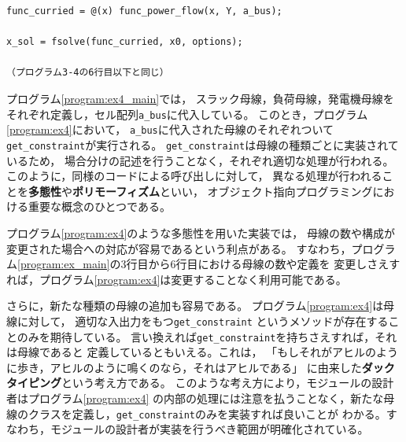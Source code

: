 \documentclass[tombow,dvipdfmx]{corona-a5-1.1}
\begin{document}
\begin{例}[多態性を用いた潮流計算の実装例]
\begin{PROGRAMA}[count,title={main\_ex4.m}]
\begin{verbatim}
func_curried = @(x) func_power_flow(x, Y, a_bus);

x_sol = fsolve(func_curried, x0, options);

（プログラム3-4の6行目以下と同じ）
\end{verbatim}
\end{PROGRAMA}
プログラム\nobreak\ref{program:ex4_main}では，
スラック母線，負荷母線，発電機母線を
それぞれ定義し，セル配列\verb|a_bus|に代入している。
このとき，プログラム\nobreak\ref{program:ex4}において，
\verb|a_bus|に代入された母線のそれぞれついて\verb|get_constraint|が実行される。
\verb|get_constraint|は母線の種類ごとに実装されているため，
場合分けの記述を行うことなく，それぞれ適切な処理が行われる。
このように，同様のコードによる呼び出しに対して，
異なる処理が行われることを\textbf{多態性}や\textbf{ポリモーフィズム}といい，
オブジェクト指向プログラミングにおける重要な概念のひとつである。

プログラム\nobreak\ref{program:ex4}のような多態性を用いた実装では，
母線の数や構成が変更された場合への対応が容易であるという利点がある。
すなわち，プログラム\nobreak\ref{program:ex_main}の3行目から6行目における母線の数や定義を
変更しさえすれば，プログラム\nobreak\ref{program:ex4}は変更することなく利用可能である。

さらに，新たな種類の母線の追加も容易である。
プログラム\nobreak\ref{program:ex4}は母線に対して，
適切な入出力をもつ\verb|get_constraint|
というメソッドが存在することのみを期待している。
言い換えれば\verb|get_constraint|を持ちさえすれば，それは母線であると
定義しているともいえる。これは，
「もしそれがアヒルのように歩き，アヒルのように鳴くのなら，それはアヒルである」
に由来した\textbf{ダックタイピング}という考え方である。
このような考え方により，モジュールの設計者はプログラム\nobreak\ref{program:ex4}
の内部の処理には注意を払うことなく，新たな母線のクラスを定義し，\verb|get_constraint|のみを実装すれば良いことが
わかる。すなわち，モジュールの設計者が実装を行うべき範囲が明確化されている。
\end{例}
\end{document}
